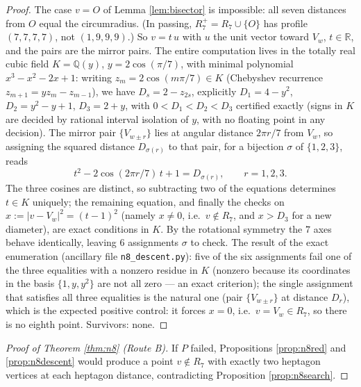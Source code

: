 \documentclass[11pt]{article}
\theoremstyle{definition}
\theoremstyle{remark}
\newcommand{\R}{\mathbb{R}}
\newcommand{\Q}{\mathbb{Q}}
\begin{document}
\begin{proof}
The case $v = O$ of Lemma \ref{lem:bisector} is impossible: all seven distances from
$O$ equal the circumradius. (In passing, $R_7^+ = R_7 \cup \{O\}$ has profile
$(7,7,7,7)$, not $(1,9,9,9)$.) So $v = t\,u$ with $u$ the unit vector toward $V_w$,
$t \in \R$, and the pairs are the mirror pairs. The entire computation lives in the
totally real cubic field $K = \Q(y)$, $y = 2\cos(\pi/7)$, with minimal polynomial
$x^3 - x^2 - 2x + 1$: writing $z_m = 2\cos(m\pi/7) \in K$ (Chebyshev recurrence
$z_{m+1} = y z_m - z_{m-1}$), we have $D_s = 2 - z_{2s}$, explicitly
$D_1 = 4 - y^2$, $D_2 = y^2 - y + 1$, $D_3 = 2 + y$, with $0 < D_1 < D_2 < D_3$
certified exactly (signs in $K$ are decided by rational interval isolation of $y$, with
no floating point in any decision). The mirror pair $\{V_{w \pm r}\}$ lies at angular
distance $2\pi r/7$ from $V_w$, so assigning the squared distance $D_{\sigma(r)}$ to
that pair, for a bijection $\sigma$ of $\{1,2,3\}$, reads
\[
t^2 - 2\cos(2\pi r/7)\, t + 1 = D_{\sigma(r)}, \qquad r = 1, 2, 3 .
\]
The three cosines are distinct, so subtracting two of the equations determines
$t \in K$ uniquely; the remaining equation, and finally the checks on
$x := |v - V_w|^2 = (t-1)^2$ (namely $x \ne 0$, i.e.\ $v \notin R_7$, and
$x > D_3$ for a new diameter), are exact conditions in $K$. By the rotational symmetry
the $7$ axes behave identically, leaving $6$ assignments $\sigma$ to check. The result
of the exact enumeration (ancillary file \texttt{n8\_descent.py}): five of the six
assignments fail one of the three equalities with a nonzero residue in $K$ (nonzero
because its coordinates in the basis $\{1, y, y^2\}$ are not all zero --- an exact
criterion); the single assignment that satisfies all three equalities is the natural
one (pair $\{V_{w\pm r}\}$ at distance $D_r$), which is the expected positive control:
it forces $x = 0$, i.e.\ $v = V_w \in R_7$, so there is no eighth point. Survivors:
none.
\end{proof}

\begin{proof}[Proof of Theorem \ref{thm:n8} (Route B)]
If $P$ failed, Propositions \ref{prop:n8red} and \ref{prop:n8descent} would produce a
point $v \notin R_7$ with exactly two heptagon vertices at each heptagon distance,
contradicting Proposition \ref{prop:n8search}.
\end{proof}
\end{document}
